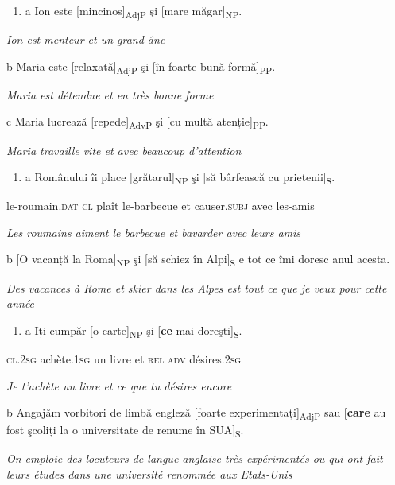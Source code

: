 \begin{enumerate}
\item \label{bkm:Ref269821144}a  Ion este [mincinos]\textsubscript{AdjP} şi [mare măgar]\textsubscript{NP}.


\end{enumerate}
{\itshape
Ion est menteur et un grand âne}

  b  Maria este [relaxată]\textsubscript{AdjP} şi [în foarte bună formă]\textsubscript{PP}.

{\itshape
Maria est détendue et en très bonne forme} 

  c  Maria lucrează [repede]\textsubscript{AdvP} şi [cu multă atenție]\textsubscript{PP}. 

{\itshape
Maria travaille vite et avec beaucoup d'attention}


\begin{enumerate}
\item \label{bkm:Ref300509910}a  Românului  îi  place  [grătarul]\textsubscript{NP}  şi  [să bârfească  cu  prietenii]\textsubscript{S}.


\end{enumerate}
    le-roumain\textsc{.dat  cl}  plaît  le-barbecue  et  causer.\textsc{subj}  avec  les-amis

{\itshape
Les roumains aiment le barbecue et bavarder avec leurs amis}

  b  [O vacanță la Roma]\textsubscript{NP} şi [să schiez în Alpi]\textsubscript{S} e tot ce îmi doresc anul acesta.

{\itshape
Des vacances à Rome et skier dans les Alpes est tout ce que je veux pour cette année}


\begin{enumerate}
\item \label{bkm:Ref300509933}a  Iți cumpăr [o carte]\textsubscript{NP} şi [\textbf{ce} mai doreşti]\textsubscript{S}.


\end{enumerate}
\textsc{    cl.2sg} achète.1\textsc{sg} un livre et \textsc{rel adv} désires.2\textsc{sg}

{\itshape
Je t'achète un livre et ce que tu désires encore}

  b  Angajăm vorbitori de limbă engleză [foarte experimentați]\textsubscript{AdjP} sau [\textbf{care} au fost şcoliți la o universitate de renume în SUA]\textsubscript{S}. 

{\itshape
On emploie des locuteurs de langue anglaise très expérimentés ou qui ont fait leurs études dans une université renommée aux Etats-Unis}

